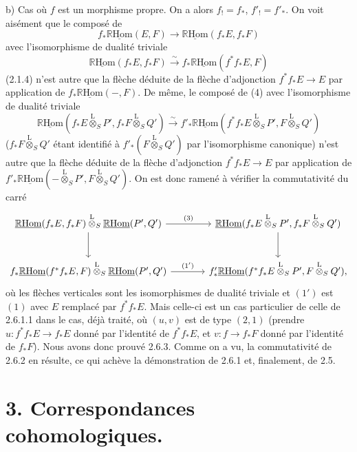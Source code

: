 \documentclass[11pt]{article}
\newcommand{\R}{\mathbb{R}}\newcommand{\RHomCore}{\mathbb{R}\mathrm{Hom}}
\providecommand{\RHom}{\RHomCore}
\providecommand{\uRHom}{\underline{\RHom}}
\providecommand{\RHom}{\RHomCore}
\providecommand{\RHom}{\R\mathcal{H}om}
\providecommand{\R}{\mathrm R}
\providecommand{\RHom}{\RHomCore}
\begin{document}
b) Cas où $f$ est un morphisme propre. On a alors $f_!=f_*$, $f'_!=f'_*$. On voit aisément que le composé de
\[
f_*\uRHom(E,F)\longrightarrow\uRHom(f_*E,f_*F)
\]
avec l'isomorphisme de dualité triviale
\[
\uRHom(f_*E,f_*F)\xrightarrow{\sim}f_*\uRHom(f^{*}f_*E,F)
\]
(2.1.4) n'est autre que la flèche déduite de la flèche d'adjonction $f^{*}f_*E\to E$ par application de $f_*\uRHom(-,F)$. De même, le composé de (4) avec l'isomorphisme de dualité triviale
\[
\uRHom(f_*E\overset{\mathrm{L}}{\otimes}_SP',f_*F\overset{\mathrm{L}}{\otimes}_SQ')\xrightarrow{\sim}f'_*\uRHom(f^{*}f_*E\overset{\mathrm{L}}{\otimes}_SP',F\overset{\mathrm{L}}{\otimes}_SQ')
\]
($f_*F\overset{\mathrm{L}}{\otimes}_SQ'$ étant identifié à $f'_*(F\overset{\mathrm{L}}{\otimes}_SQ')$ par l'isomorphisme canonique) n'est autre que la flèche déduite de la flèche d'adjonction $f^{*}f_*E\to E$ par application de $f'_*\uRHom(-\overset{\mathrm{L}}{\otimes}_SP',F\overset{\mathrm{L}}{\otimes}_SQ')$. On est donc ramené à vérifier la commutativité du carré
\[
\begin{tikzcd}[column sep=large,row sep=large]
\uRHom(f_*E,f_*F)\overset{\mathrm{L}}{\otimes}_S\uRHom(P',Q') \arrow[r,"(3)"] \arrow[d] & \uRHom(f_*E\overset{\mathrm{L}}{\otimes}_SP',f_*F\overset{\mathrm{L}}{\otimes}_SQ') \arrow[d]\\
f_*\uRHom(f^{*}f_*E,F)\overset{\mathrm{L}}{\otimes}_S\uRHom(P',Q') \arrow[r,"(1')"] & f'_*\uRHom(f^{*}f_*E\overset{\mathrm{L}}{\otimes}_SP',F\overset{\mathrm{L}}{\otimes}_SQ'),
\end{tikzcd}
\]
où les flèches verticales sont les isomorphismes de dualité triviale et $(1')$ est $(1)$ avec $E$ remplacé par $f^{*}f_*E$. Mais celle-ci est un cas particulier de celle de 2.6.1.1 dans le cas, déjà traité, où $(u,v)$ est de type $(2,1)$ (prendre $u:f^{*}f_*E\to f_*E$ donné par l'identité de $f^{*}f_*E$, et $v:f\to f_*F$ donné par l'identité de $f_*F$). Nous avons donc prouvé 2.6.3. Comme on a vu, la commutativité de 2.6.2 en résulte, ce qui achève la démonstration de 2.6.1 et, finalement, de 2.5.

\clearpage
\section*{3. Correspondances cohomologiques.}
\end{document}
